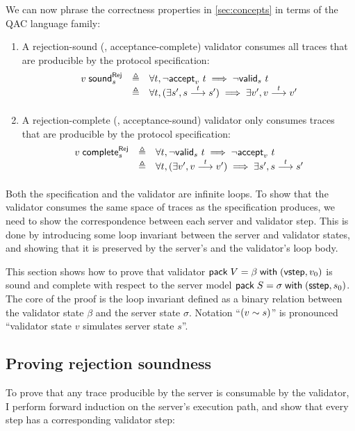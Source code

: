 We can now phrase the correctness properties in \autoref{sec:concepts} in terms
of the QAC language family:
\begin{enumerate}
  \item A rejection-sound (\ie, acceptance-complete) validator consumes
    all traces that are producible by the protocol specification:
    \[\begin{array}{lrl}
      \rejSound v s&\triangleq&\forall t,\rejects v t\implies\invalid s t\\
      &\triangleq&\forall t,(\exists s',\behaves s t s')\implies\exists v',\behaves v t v'
    \end{array}\]
  \item A rejection-complete (\ie, acceptance-sound) validator only
    consumes traces that are producible by the protocol specification:
    \[\begin{array}{lrl}
      \rejComplete v s&\triangleq&\forall t,\invalid s t\implies\rejects v t\\
      &\triangleq&\forall t,(\exists v',\behaves v t v')\implies\exists s',\behaves s t s'
    \end{array}\]
\end{enumerate}

Both the specification and the validator are infinite loops.  To show that the
validator consumes the same space of traces as the specification produces, we
need to show the correspondence between each server and validator step.  This is
done by introducing some loop invariant between the server and validator states,
and showing that it is preserved by the server's and the validator's loop body.

This section shows how to prove that validator $\mathsf{pack}\;V=\beta\;\mathsf{with}\;(\mathsf{vstep},v_0)$
is sound and complete with respect to the server model
$\mathsf{pack}\;S=\sigma\;\mathsf{with}\;(\mathsf{sstep},s_0)$.  The core of the proof is the loop invariant
defined as a binary relation between the validator state $\beta$ and the server
state $\sigma$.  Notation ``$(v\sim s)$'' is pronounced ``validator state
$v$ simulates server state $s$''.

\subsection{Proving rejection soundness}
\label{sec:qac-soundness}
To prove that any trace producible by the server is consumable by the validator,
I perform forward induction on the server's execution path, and show that every
step has a corresponding validator step:


